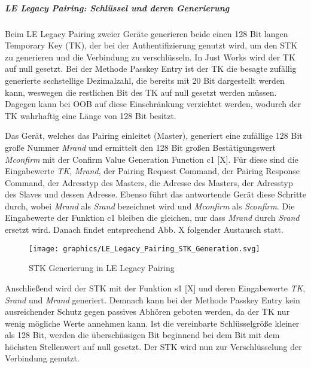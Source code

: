 \subparagraph{LE Legacy Pairing: Schlüssel und deren Generierung}

Beim LE Legacy Pairing zweier Geräte generieren beide einen 128 Bit langen Temporary Key (TK), der bei der Authentifizierung genutzt wird, um den STK zu generieren und die Verbindung zu verschlüsseln. In Just Works wird der TK auf null gesetzt. Bei der Methode Passkey Entry ist der TK die besagte zufällig generierte sechstellige Dezimalzahl, die bereits mit 20 Bit dargestellt werden kann, weswegen die restlichen Bit des TK auf null gesetzt werden müssen. Dagegen kann bei OOB auf diese Einschränkung verzichtet werden, wodurch der TK wahrhaftig eine Länge von 128 Bit besitzt.

Das Gerät, welches das Pairing einleitet (Master), generiert eine zufällige 128 Bit große Nummer \textit{Mrand} und ermittelt den 128 Bit großen Bestätigungswert \textit{Mconfirm} mit der Confirm Value Generation Function c1 [X]. 
Für diese sind die Eingabewerte \textit{TK}, \textit{Mrand}, der Pairing Request Command, der Pairing Response Command, der Adresstyp des Masters, die Adresse des Masters, der Adresstyp des Slaves und dessen Adresse. Ebenso führt das antwortende Gerät diese Schritte durch, wobei \textit{Mrand} als \textit{Srand} bezeichnet wird und \textit{Mconfirm} als \textit{Sconfirm}. Die Eingabewerte der Funktion c1 bleiben die gleichen, nur dass \textit{Mrand} durch \textit{Srand} ersetzt wird. Danach findet entsprechend Abb. X folgender Austausch statt.
\begin{figure}[hbt!]
    \centering
    \texttt{[image: graphics/LE\_Legacy\_Pairing\_STK\_Generation.svg]}
    \caption{STK Generierung in LE Legacy Pairing}
\end{figure}

Anschließend wird der STK mit der Funktion s1 [X] 
und deren Eingabewerte \textit{TK}, \textit{Srand} und \textit{Mrand} generiert. Demnach kann bei der Methode Passkey Entry kein ausreichender Schutz gegen passives Abhören geboten werden, da der TK nur wenig mögliche Werte annehmen kann. Ist die vereinbarte Schlüsselgröße kleiner als 128 Bit, werden die überschüssigen Bit beginnend bei dem Bit mit dem höchsten Stellenwert auf null gesetzt. Der STK wird nun zur Verschlüsselung der Verbindung genutzt.



